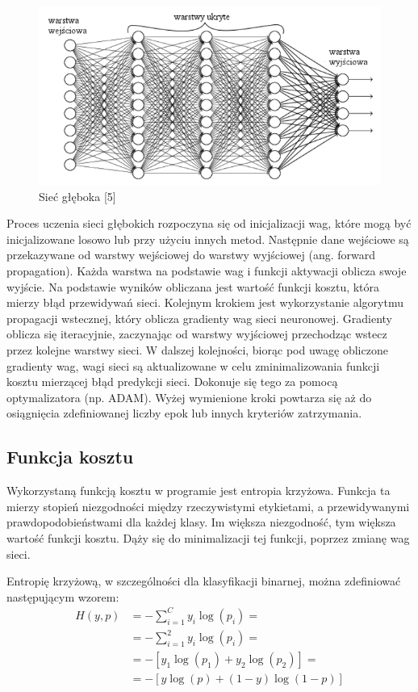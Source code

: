 \documentclass[a4paper]{article}
\begin{document}
\begin{figure}[H]
    \centering
    \includegraphics[width=1\textwidth, keepaspectratio]{pictures/siec_gleboka.png}
    \caption{Sieć głęboka [5]}
    \label{fig:siec}
\end{figure}

Proces uczenia sieci głębokich rozpoczyna się od inicjalizacji wag, które mogą być inicjalizowane losowo lub przy użyciu innych metod.
Następnie dane wejściowe są przekazywane od warstwy wejściowej do warstwy wyjściowej (ang. forward propagation).
Każda warstwa na podstawie wag i funkcji aktywacji oblicza swoje wyjście.
Na podstawie wyników obliczana jest wartość funkcji kosztu, która mierzy błąd przewidywań sieci.
Kolejnym krokiem jest wykorzystanie algorytmu propagacji wstecznej, który oblicza gradienty wag sieci neuronowej.
Gradienty oblicza się iteracyjnie, zaczynając od warstwy wyjściowej przechodząc wstecz przez kolejne warstwy sieci.
W dalszej kolejności, biorąc pod uwagę obliczone gradienty wag, wagi sieci są aktualizowane w celu zminimalizowania funkcji kosztu mierzącej błąd predykcji sieci.
Dokonuje się tego za pomocą optymalizatora (np. ADAM).
Wyżej wymienione kroki powtarza się aż do osiągnięcia zdefiniowanej liczby epok lub innych kryteriów zatrzymania.
\subsection{Funkcja kosztu}
Wykorzystaną funkcją kosztu w programie jest entropia krzyżowa.
Funkcja ta mierzy stopień niezgodności między rzeczywistymi etykietami, a przewidywanymi prawdopodobieństwami dla każdej klasy.
Im większa niezgodność, tym większa wartość funkcji kosztu.
Dąży się do minimalizacji tej funkcji, poprzez zmianę wag sieci.

Entropię krzyżową, w szczególności dla klasyfikacji binarnej, można zdefiniować następującym wzorem:
\begin{align*}
    H(y, p) & = -\sum_{i=1}^{C} y_i \log(p_i) =    \\
            & = -\sum_{i=1}^{2} y_i \log(p_i) =    \\
            & = -[y_1 \log(p_1) + y_2 \log(p_2)] = \\
            & = - [y \log(p) + (1-y) \log(1-p)]
\end{align*}
\end{document}
